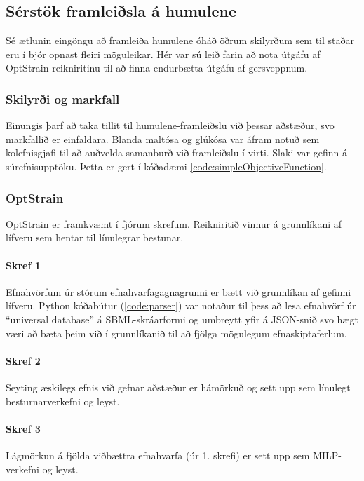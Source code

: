 \documentclass[11pt]{article}
\begin{document}
\begin{multicols}{2}
\subsection{Sérstök framleiðsla á humulene}
Sé ætlunin eingöngu að framleiða humulene óháð öðrum skilyrðum sem til staðar eru í bjór opnast fleiri möguleikar. Hér var sú leið farin að nota útgáfu af OptStrain reikniritinu \cite{pharkya2004optstrain} til að finna endurbætta útgáfu af gersveppnum.
\subsubsection{Skilyrði og markfall}
Einungis þarf að taka tillit til humulene-framleiðslu við þessar aðstæður, svo markfallið er einfaldara. Blanda maltósa og glúkósa var áfram notuð sem kolefnisgjafi til að auðvelda samanburð við framleiðslu í virti. Slaki var gefinn á súrefnisupptöku. Þetta er gert í kóðadæmi \ref{code:simpleObjectiveFunction}.
\subsubsection{OptStrain}
\label{sec:optstrain}
OptStrain er framkvæmt í fjórum skrefum. Reikniritið vinnur á grunnlíkani af lífveru sem hentar til línulegrar bestunar.

\paragraph{Skref 1}
Efnahvörfum úr stórum efnahvarfagagnagrunni er bætt við grunnlíkan af gefinni lífveru. Python kóðabútur (\ref{code:parser}) var notaður til þess að lesa efnahvörf úr ``universal database'' á SBML-skráarformi og umbreytt yfir á JSON-snið svo hægt væri að bæta þeim við í grunnlíkanið til að fjölga mögulegum efnaskiptaferlum.

\paragraph{Skref 2}
Seyting æskilegs efnis við gefnar aðstæður er hámörkuð og sett upp sem línulegt besturnarverkefni og leyst. %

\paragraph{Skref 3}
Lágmörkun á fjölda viðbættra efnahvarfa (úr 1. skrefi) er sett upp sem MILP-verkefni og leyst. %


\end{multicols}
\end{document}
